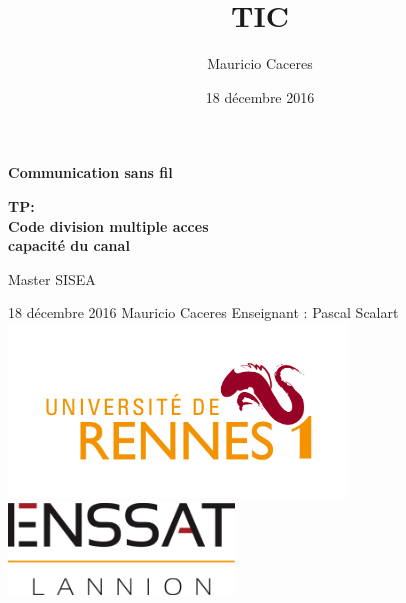 \documentclass{report}
\title{TIC}
\author{Mauricio Caceres}
\date{18 décembre 2016}
\begin{document}
\begin{titlepage}
	\centering
	\vfill
{\bfseries\huge Communication sans fil}
	\vfill
	{\bfseries\LARGE
		TP:\\
		Code division multiple acces \\capacité du canal
		\\
		\vskip2cm

		Master SISEA\\
	
	}
	\vfill
	18 décembre 2016
	\vfill
	{\large Mauricio Caceres } \hfill  {\large Enseignant : Pascal Scalart}
	\vfill
	\includegraphics[width=9cm]{rennes} %
	\vfill
	\includegraphics[width=6cm]{enssat} %
	\vfill
	\vfill
\end{titlepage}
\tableofcontents




\end{document}
